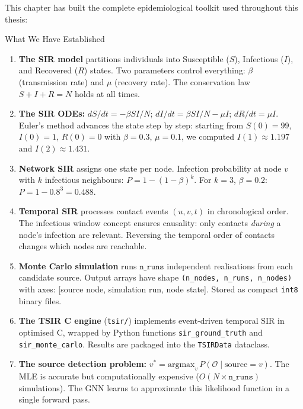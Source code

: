 This chapter has built the complete epidemiological toolkit used throughout this thesis:

\begin{conceptbox}{What We Have Established}
\begin{enumerate}[noitemsep]
    \item \textbf{The SIR model} partitions individuals into Susceptible ($S$), Infectious ($I$), and Recovered ($R$) states. Two parameters control everything: $\beta$ (transmission rate) and $\mu$ (recovery rate). The conservation law $S + I + R = N$ holds at all times.

    \item \textbf{The SIR ODEs:} $dS/dt = -\beta SI/N$; $dI/dt = \beta SI/N - \mu I$; $dR/dt = \mu I$. Euler's method advances the state step by step: starting from $S(0)=99$, $I(0)=1$, $R(0)=0$ with $\beta=0.3$, $\mu=0.1$, we computed $I(1) \approx 1.197$ and $I(2) \approx 1.431$.

    \item \textbf{Network SIR} assigns one state per node. Infection probability at node $v$ with $k$ infectious neighbours: $P = 1 - (1-\beta)^k$. For $k=3$, $\beta=0.2$: $P = 1 - 0.8^3 = 0.488$.

    \item \textbf{Temporal SIR} processes contact events $(u, v, t)$ in chronological order. The infectious window concept ensures causality: only contacts \emph{during} a node's infection are relevant. Reversing the temporal order of contacts changes which nodes are reachable.

    \item \textbf{Monte Carlo simulation} runs $\texttt{n\_runs}$ independent realisations from each candidate source. Output arrays have shape \texttt{(n\_nodes, n\_runs, n\_nodes)} with axes: [source node, simulation run, node state]. Stored as compact \texttt{int8} binary files.

    \item \textbf{The TSIR C engine} (\texttt{tsir/}) implements event-driven temporal SIR in optimised C, wrapped by Python functions \texttt{sir\_ground\_truth} and \texttt{sir\_monte\_carlo}. Results are packaged into the \texttt{TSIRData} dataclass.

    \item \textbf{The source detection problem:} $v^* = \mathrm{argmax}_v\, P(\mathcal{O} \mid \text{source}=v)$. The MLE is accurate but computationally expensive ($O(N \times \texttt{n\_runs})$ simulations). The GNN learns to approximate this likelihood function in a single forward pass.


\end{enumerate}
\end{conceptbox}
